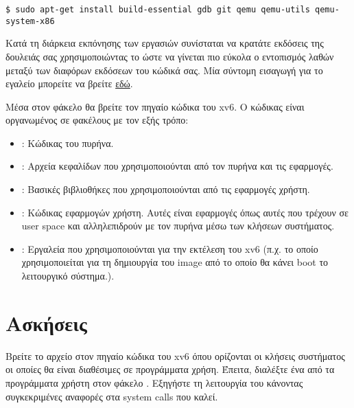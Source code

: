\documentclass[18pt]{extarticle}
\begin{document}
\begin{commandline}
\begin{verbatim}
$ sudo apt-get install build-essential gdb git qemu qemu-utils qemu-system-x86
\end{verbatim}
\end{commandline}

Κατά τη διάρκεια εκπόνησης των εργασιών συνίσταται να κρατάτε εκδόσεις της δουλειάς σας χρησιμοποιώντας το 
ώστε να γίνεται πιο εύκολα ο εντοπισμός λαθών μεταξύ των διαφόρων εκδόσεων του κώδικά σας.
Μία σύντομη εισαγωγή για το εγαλείο μπορείτε να βρείτε \href{https://rogerdudler.github.io/git-guide/}{εδώ}. 

Μέσα στον φάκελο  θα βρείτε τον πηγαίο κώδικα του xv6.
Ο κώδικας είναι οργανωμένος σε φακέλους με τον εξής τρόπο: 

\begin{itemize}[label={--}]
    \item {}: Κώδικας του πυρήνα.
    \item {}: Αρχεία κεφαλίδων που χρησιμοποιούνται από τον πυρήνα και τις εφαρμογές.
    \item {}: Βασικές βιβλιοθήκες που χρησιμοποιούνται από τις εφαρμογές χρήστη.
    \item {}: Κώδικας εφαρμογών χρήστη. Αυτές είναι εφαρμογές όπως αυτές που τρέχουν σε user space και αλληλεπιδρούν με τον πυρήνα μέσω των κλήσεων συστήματος.
    \item {}: Εργαλεία που χρησιμοποιούνται για την εκτέλεση του xv6 (π.χ.  το οποίο χρησιμοποιείται για τη δημιουργία του image από το οποίο θα κάνει boot το λειτουργικό σύστημα.).
\end{itemize}

\section{Ασκήσεις}

\begin{question}
    Βρείτε το αρχείο στον πηγαίο κώδικα του xv6 όπου ορίζονται οι κλήσεις συστήματος οι οποίες θα είναι διαθέσιμες σε προγράμματα χρήση.
    Έπειτα, διαλέξτε ένα από τα προγράμματα χρήστη στον φάκελο . Εξηγήστε τη λειτουργία του κάνοντας συγκεκριμένες αναφορές στα system calls που καλεί.
\end{question}
\end{document}
